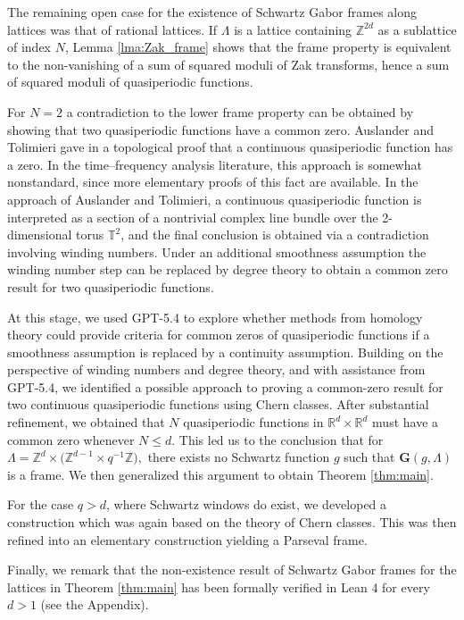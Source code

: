 \documentclass[reqno,a4paper,12pt]{amsart}
\numberwithin{equation}{section}
\def\Z{{\mathbb Z}}
\def\R{{\mathbb R}}
\def\T{{\mathbb T}}
\newcommand\1{\mathds{1}}
\begin{document}
The remaining open case for the existence of Schwartz Gabor frames along lattices was that of rational lattices. If $\Lambda$ is a lattice containing $\Z^{2d}$ as a sublattice of index $N$, Lemma \ref{lma:Zak_frame} shows that the frame property is equivalent to the non-vanishing of a sum of squared moduli of Zak transforms, hence a sum of squared moduli of quasiperiodic functions.

For $N=2$ a contradiction to the lower frame property can be obtained by showing that two quasiperiodic functions have a common zero. Auslander and Tolimieri gave in \cite[p.~18, Theorem II.2]{auslander2006abelian} a topological proof that a continuous quasiperiodic function has a zero. In the time--frequency analysis literature, this approach is somewhat nonstandard, since more elementary proofs of this fact are available. In the approach of Auslander and Tolimieri, a continuous quasiperiodic function is interpreted as a section of a nontrivial complex line bundle over the 2-dimensional torus $\T^2$, and the final conclusion is obtained via a contradiction involving winding numbers. Under an additional smoothness assumption the winding number step can be replaced by degree theory \cite{milnor1965topology,guillemin2025differential} to obtain a common zero result for two quasiperiodic functions.

At this stage, we used GPT-5.4 to explore whether methods from homology theory could provide criteria for common zeros of quasiperiodic functions if a smoothness assumption is replaced by a continuity assumption. Building on the perspective of winding numbers and degree theory, and with assistance from GPT-5.4, we identified a possible approach to proving a common-zero result for two continuous quasiperiodic functions using Chern classes. After substantial refinement, we obtained that $N$ quasiperiodic functions in $\R^d \times \R^d$ must have a common zero whenever $N \leq d$. This led us to the conclusion that for
$
\Lambda=\mathbb{Z}^d\times\bigl(\mathbb{Z}^{d-1}\times q^{-1}\mathbb{Z}\bigr),
$
there exists no Schwartz function $g$ such that $\mathbf{G}(g,\Lambda)$ is a frame. We then generalized this argument to obtain Theorem \ref{thm:main}.

For the case $q>d$, where Schwartz windows do exist, we developed a construction which was again based on the theory of Chern classes. This was then refined into an elementary construction yielding a Parseval frame.

Finally, we remark that the non-existence result of Schwartz Gabor frames for the lattices in Theorem \ref{thm:main} has been formally verified in Lean 4 for every $d>1$ (see the Appendix).
\end{document}
